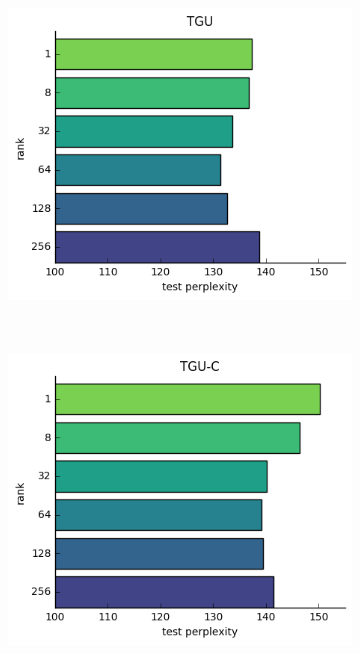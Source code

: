 \begin{figure}
\begin{subfigure}[t]{0.45\textwidth}
	\includegraphics[width=\textwidth]{exps/ptb/tgu-rank}
\end{subfigure}~
\begin{subfigure}[t]{0.45\textwidth}
	\includegraphics[width=\textwidth]{exps/ptb/tguc-rank}
\end{subfigure}
\begin{subfigure}[t]{0.45\textwidth}

\end{subfigure}
\end{figure}
